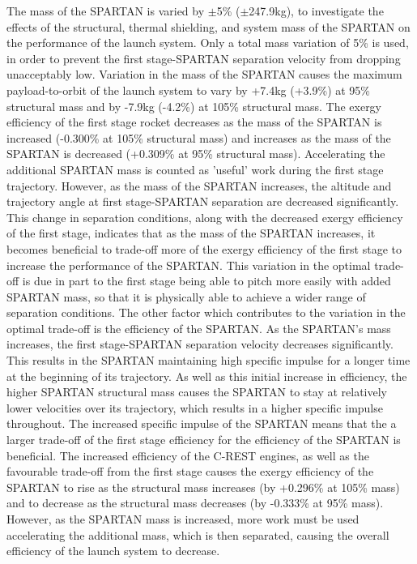 The mass of the SPARTAN is varied by $\pm$5\% ($\pm$247.9kg), to investigate the effects of the structural, thermal shielding, and system mass of the SPARTAN on the performance of the launch system. Only a total mass variation of 5\% is used, in order to prevent the first stage-SPARTAN separation velocity from dropping unacceptably low. 
Variation in the mass of the SPARTAN causes the maximum payload-to-orbit of the launch system to vary by +7.4kg (+3.9\%) at 95\% structural mass and by -7.9kg (-4.2\%) at 105\% structural mass. 
The exergy efficiency of the first stage rocket decreases as the mass of the SPARTAN is increased (-0.300\% at 105\% structural mass) and increases as the mass of the SPARTAN is decreased (+0.309\% at 95\% structural mass). Accelerating the additional SPARTAN mass is counted as 'useful' work during the first stage trajectory. However, as the mass of the SPARTAN increases, the altitude and trajectory angle at first stage-SPARTAN separation are decreased significantly. This change in separation conditions, along with the decreased exergy efficiency of the first stage, indicates that as the mass of the SPARTAN increases, it becomes beneficial to trade-off more of the exergy efficiency of the first stage to increase the performance of the SPARTAN. This variation in the optimal trade-off is due in part to the first stage being able to pitch more easily with added SPARTAN mass, so that it is physically able to achieve a wider range of separation conditions. The other factor which contributes to the variation in the optimal trade-off is the efficiency of the SPARTAN. As the SPARTAN's mass increases, the first stage-SPARTAN separation velocity decreases significantly. This results in the SPARTAN maintaining high specific impulse for a longer time at the beginning of its trajectory. As well as this initial increase in efficiency, the higher SPARTAN structural mass causes the SPARTAN to stay at relatively lower velocities over its trajectory, which results in a higher specific impulse throughout. The increased specific impulse of the SPARTAN means that the a larger trade-off of the first stage efficiency for the efficiency of the SPARTAN is beneficial. 
The increased efficiency of the C-REST engines, as well as the favourable trade-off from the first stage causes the exergy efficiency of the SPARTAN to rise as the structural mass increases (by +0.296\% at 105\% mass) and to decrease as the structural mass decreases (by -0.333\% at 95\% mass). However, as the SPARTAN mass is increased, more work must be used accelerating the additional mass, which is then separated, causing the overall efficiency of the launch system to decrease. 

